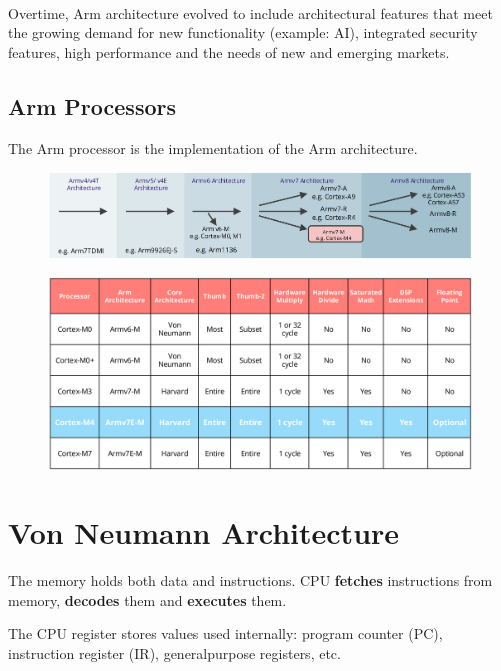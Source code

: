 \paragraph{}
Overtime, Arm architecture evolved to include architectural features that meet the growing demand for
new functionality (example: AI), integrated security features, high performance and the needs of new and
emerging markets.

\subsection*{Arm Processors}

The Arm processor is the implementation of the Arm architecture.

\begin{figure}[H]
    \centering
    \includegraphics[width=1\linewidth]{img/image9.png}
\end{figure}

\begin{figure}[H]
    \centering
    \includegraphics[width=1\linewidth]{img/image10.png}
\end{figure}


\section{Von Neumann Architecture }

The memory holds both data and instructions. CPU \textbf{fetches} instructions from memory, \textbf{decodes} them and
\textbf{executes} them.

The CPU register stores values used internally: program counter (PC), instruction register (IR), generalpurpose registers, etc.

